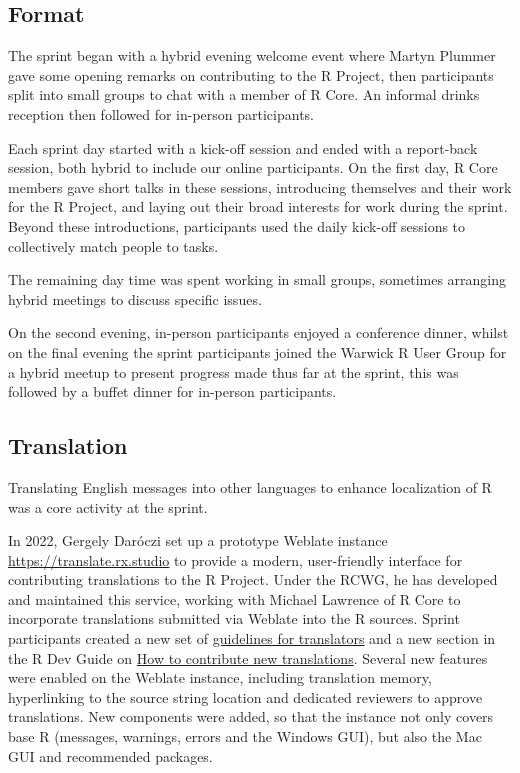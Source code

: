 \hypertarget{format}{%
\subsection{Format}\label{format}}

The sprint began with a hybrid evening welcome event where Martyn Plummer gave some opening remarks on contributing to the R Project, then participants split into small groups to chat with a member of R Core. An informal drinks reception then followed for in-person participants.

Each sprint day started with a kick-off session and ended with a report-back session, both hybrid to include our online participants. On the first day, R Core members gave short talks in these sessions, introducing themselves and their work for the R Project, and laying out their broad interests for work during the sprint. Beyond these introductions, participants used the daily kick-off sessions to collectively match people to tasks.

The remaining day time was spent working in small groups, sometimes arranging
hybrid meetings to discuss specific issues.

On the second evening, in-person participants enjoyed a conference dinner, whilst on the final evening the sprint participants joined the Warwick R User Group for a hybrid meetup to present progress made thus far at the sprint, this was followed by a buffet dinner for in-person participants.

\hypertarget{translation}{%
\subsection{Translation}\label{translation}}

Translating English messages into other languages to enhance
localization of R was a core activity at the sprint.

In 2022, Gergely Daróczi set up a prototype Weblate instance \url{https://translate.rx.studio} to provide a modern, user-friendly interface for contributing translations to the R Project. Under the RCWG, he has developed and maintained this service, working with Michael Lawrence of R Core to incorporate translations submitted via Weblate into the R sources. Sprint participants created a new
set of \href{https://contributor.r-project.org/translations/}{guidelines for translators} and
a new section in the R Dev Guide on \href{https://contributor.r-project.org/rdevguide/message-translations.html\#how-to-contribute-new-translations}{How to contribute new translations}. Several new features were enabled on the Weblate instance,
including translation memory, hyperlinking to the source string location and
dedicated reviewers to approve translations. New components were added, so that
the instance not only covers base R (messages, warnings, errors and the
Windows GUI), but also the Mac GUI and recommended packages.

